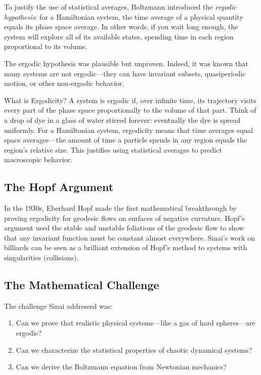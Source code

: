 To justify the use of statistical averages, Boltzmann introduced the \emph{ergodic hypothesis}: for a Hamiltonian system, the time average of a physical quantity equals its phase space average. In other words, if you wait long enough, the system will explore all of its available states, spending time in each region proportional to its volume.

The ergodic hypothesis was plausible but unproven. Indeed, it was known that many systems are not ergodic---they can have invariant subsets, quasiperiodic motion, or other non-ergodic behavior.

\begin{knowledgebridge}{What is Ergodicity?}
A system is ergodic if, over infinite time, its trajectory visits every part of the phase space proportionally to the volume of that part. Think of a drop of dye in a glass of water stirred forever: eventually the dye is spread uniformly. For a Hamiltonian system, ergodicity means that time averages equal space averages---the amount of time a particle spends in any region equals the region's relative size. This justifies using statistical averages to predict macroscopic behavior.
\end{knowledgebridge}

\subsection{The Hopf Argument}

In the 1930s, Eberhard Hopf made the first mathematical breakthrough by proving ergodicity for geodesic flows on surfaces of negative curvature. Hopf's argument used the stable and unstable foliations of the geodesic flow to show that any invariant function must be constant almost everywhere. Sinai's work on billiards can be seen as a brilliant extension of Hopf's method to systems with singularities (collisions).

\subsection{The Mathematical Challenge}

The challenge Sinai addressed was:
\begin{enumerate}
\item Can we prove that realistic physical systems---like a gas of hard spheres---are ergodic?
\item Can we characterize the statistical properties of chaotic dynamical systems?
\item Can we derive the Boltzmann equation from Newtonian mechanics?
\end{enumerate}

